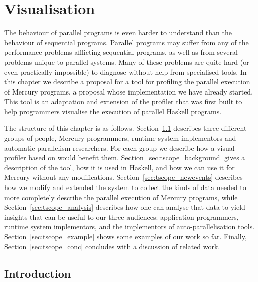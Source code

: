 
\chapter{Visualisation}
\label{chap:tscope}

\newcommand{\event}[1]{\code{#1}\xspace}
\newcommand{\metric}[1]{\textsc{#1}\xspace}
\newcommand{\metrictopic}[1]{\textbf{\textsc{#1}}\xspace}


The behaviour of parallel programs is even harder to understand
than the behaviour of sequential programs.
Parallel programs may suffer from
any of the performance problems afflicting sequential programs,
as well as from several problems unique to parallel systems.
Many of these problems are quite hard
(or even practically impossible)
to diagnose without help from specialised tools.
In this chapter we describe a proposal for a tool
for profiling the parallel execution of Mercury programs,
a proposal whose implementation we have already started.
This tool is an adaptation and extension of the \tscope profiler
that was first built to help programmers visualise
the execution of parallel Haskell programs.

The structure of this chapter is as follows.
Section~\ref{sec:tscope_intro} describes three different groups of people,
Mercury programmers, runtime system implementors and automatic parallelism
researchers.
For each group we describe how a visual profiler based on \tscope would
benefit them.
Section~\ref{sec:tscope_background} gives a description of the \tscope tool,
how it is used in Haskell,
and how we can use it for Mercury without any modifications.
Section~\ref{sec:tscope_newevents}
describes how we modify and extended the \tscope system
to collect the kinds of data needed to more completely describe
the parallel execution of Mercury programs,
while Section~\ref{sec:tscope_analysis} describes how
one can analyse that data to yield insights
that can be useful to our three audiences:
application programmers,
runtime system implementors,
and the implementors of auto-parallelisation tools.
Section~\ref{sec:tscope_example} shows some examples of our work so far.
Finally, Section~\ref{sec:tscope_conc}
concludes with a discussion of related work.

\section{Introduction}
\label{sec:tscope_intro}


